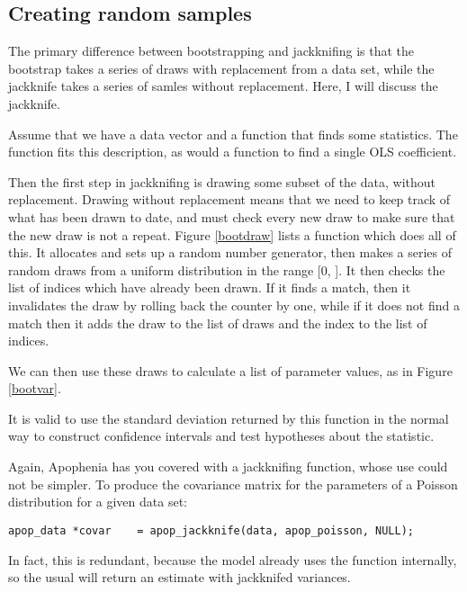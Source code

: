 \subsection{Creating random samples} 
The primary difference between bootstrapping and jackknifing is that
the bootstrap takes a series of draws with replacement from a data set,
while the jackknife takes a series of samles without replacement. Here,
I will discuss the jackknife.

Assume that we have a
data vector  and a function  that finds some statistics. The
function  fits this description, as would a function to find
a single OLS coefficient.


Then the first step in jackknifing is drawing some subset of the data,
without replacement. Drawing without replacement means that we need to
keep track of what has been drawn to date, and must check every new draw
to make sure that the new draw is not a repeat. Figure \ref{bootdraw} lists a function which
does all of this. It allocates and sets up a random number generator, then
makes a series of random draws from a uniform distribution in the range
[0, ]. It then checks the list of indices which have
already been drawn. If it finds a match, then it invalidates the draw
by rolling back the counter by one, while if it does not find a match then it
adds the draw to the list of draws and the index to the list of indices.

We can then use these draws to calculate a list of parameter values, as in Figure \ref{bootvar}.

It is valid to use the standard deviation returned by this function 
in the normal way to construct confidence intervals and test
hypotheses about the statistic.

Again, Apophenia has you covered with a jackknifing function, whose
use could not be simpler. To produce the covariance matrix for the
parameters of a Poisson distribution for a given data set:
\begin{lstlisting}
apop_data *covar    = apop_jackknife(data, apop_poisson, NULL);
\end{lstlisting}
In fact, this is redundant, because the 
model already uses the  function internally,
so the usual 
will return an estimate with jackknifed variances.

